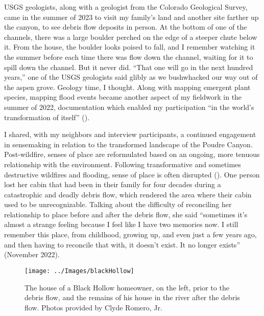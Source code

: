 \documentclass[
]{article}
\begin{document}
USGS geologists, along with a geologist from the Colorado Geological Survey, came in the summer of 2023 to visit my family's land and another site farther up the canyon, to see debris flow deposits in person. At the bottom of one of the channels, there was a large boulder perched on the edge of a steeper chute below it. From the house, the boulder looks poised to fall, and I remember watching it the summer before each time there was flow down the channel, waiting for it to spill down the channel. But it never did. ``That one will go in the next hundred years,'' one of the USGS geologists said glibly as we bushwhacked our way out of the aspen grove. Geology time, I thought. Along with mapping emergent plant species, mapping flood events became another aspect of my fieldwork in the summer of 2022, documentation which enabled my participation ``in the world's transformation of itself'' ().

I shared, with my neighbors and interview participants, a continued engagement in sensemaking in relation to the transformed landscape of the Poudre Canyon. Post-wildfire, senses of place are reformulated based on an ongoing, more tenuous relationship with the environment. Following transformative and sometimes destructive wildfires and flooding, sense of place is often disrupted (). One person lost her cabin that had been in their family for four decades during a catastrophic and deadly debris flow, which rendered the area where their cabin used to be unrecognizable. Talking about the difficulty of reconciling her relationship to place before and after the debris flow, she said ``sometimes it's almost a strange feeling because I feel like I have two memories now. I still remember this place, from childhood, growing up, and even just a few years ago, and then having to reconcile that with, it doesn't exist. It no longer exists'' (November 2022).

\begin{figure}
\texttt{[image: ../Images/blackHollow]} \caption[Black Hollow house remains]{The house of a Black Hollow homeowner, on the left, prior to the debris flow, and the remains of his house in the river after the debris flow. Photos provided by Clyde Romero, Jr.}\label{fig:figureTitle3}
\end{figure}
\end{document}
